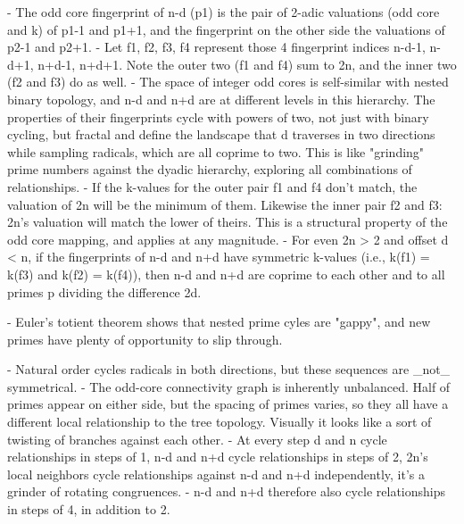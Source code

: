 \documentclass[12pt]{article}
\theoremstyle{plain}
\theoremstyle{definition}
\begin{document}
- The odd core fingerprint of n-d (p1) is the pair of 2-adic valuations (odd core and k) of p1-1 and p1+1, and the fingerprint on the other side the valuations of p2-1 and p2+1.
- Let f1, f2, f3, f4 represent those 4 fingerprint indices n-d-1, n-d+1, n+d-1, n+d+1. Note the outer two (f1 and f4) sum to 2n, and the inner two (f2 and f3) do as well.
- The space of integer odd cores is self-similar with nested binary topology, and n-d and n+d are at different levels in this hierarchy. The properties of their fingerprints cycle with powers of two, not just with binary cycling, but fractal  and define the landscape that d traverses in two directions while sampling radicals, which are all coprime to two. This is like "grinding" prime numbers against the dyadic hierarchy, exploring all combinations of relationships.
- If the k-values for the outer pair f1 and f4 don't match, the valuation of 2n will be the minimum of them. Likewise the inner pair f2 and f3: 2n's valuation will match the lower of theirs. This is a structural property of the odd core mapping, and applies at any magnitude. 
- For even 2n > 2 and offset d < n, if the fingerprints of n-d and n+d have symmetric k-values (i.e., k(f1) = k(f3) and k(f2) = k(f4)), then n-d and n+d are coprime to each other and to all primes p dividing the difference 2d.

- Euler's totient theorem shows that nested prime cyles are "gappy", and new primes have plenty of opportunity to slip through.

- Natural order cycles radicals in both directions, but these sequences are _not_ symmetrical.
- The odd-core connectivity graph is inherently unbalanced. Half of primes appear on either side, but the spacing of primes varies, so they all have a different local relationship to the tree topology. Visually it looks like a sort of twisting of branches against each other.
- At every step d and n cycle relationships in steps of 1, n-d and n+d cycle relationships in steps of 2, 2n's local neighbors cycle relationships against n-d and n+d independently, it's a grinder of rotating congruences.
- n-d and n+d therefore also cycle relationships in steps of 4, in addition to 2.
\end{document}
